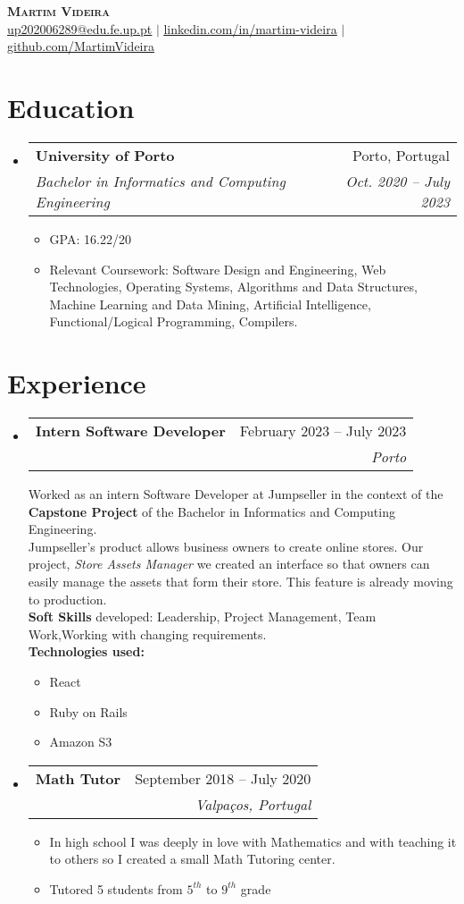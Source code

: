 \documentclass[letterpaper,11pt]{article}
\makeatletter
\newcommand{\resumeItem}[1]{
  \item\small{
    {#1 \vspace{-2pt}}
  }
}
\newcommand{\resumeSubheading}[4]{
  \vspace{-2pt}\item
    \begin{tabular*}{0.97\textwidth}[t]{l@{\extracolsep{\fill}}r}
      \textbf{#1} & #2 \\
      \textit{\small#3} & \textit{\small #4} \\
    \end{tabular*}\vspace{-7pt}
}
\newcommand{\resumeSubHeadingListStart}{\begin{itemize}[leftmargin=0.15in, label={}]}
\newcommand{\resumeSubHeadingListEnd}{\end{itemize}}
\newcommand{\resumeItemListStart}{\begin{itemize}}
\newcommand{\resumeItemListEnd}{\end{itemize}\vspace{-5pt}}
\makeatother
\begin{document}
\begin{center}
    \textbf{\Huge \scshape Martim Videira} \\ \vspace{1pt}
    \href{mailto:up202006289@edu.fe.up.pt}{\underline{up202006289@edu.fe.up.pt}} $|$ 
    \href{https://www.linkedin.com/in/martim-videira-aa766b24b/}{\underline{linkedin.com/in/martim-videira}} $|$
    \href{https://github.com/MartimVideira}{\underline{github.com/MartimVideira}}
\end{center}


\section{Education}
  \resumeSubHeadingListStart
    \resumeSubheading
      {University of Porto}{Porto, Portugal}
      {Bachelor in Informatics and Computing Engineering}{Oct. 2020 –  July 2023}
      \resumeItemListStart
        \resumeItem{GPA: 16.22/20 }
        \resumeItem{Relevant Coursework: Software Design and Engineering, Web Technologies, Operating Systems, Algorithms and Data Structures, Machine Learning and Data Mining, Artificial Intelligence, Functional/Logical Programming, Compilers.}
      \resumeItemListEnd
  \resumeSubHeadingListEnd

\section{Experience}
  \resumeSubHeadingListStart
    \resumeSubheading
      {Intern Software Developer }{February 2023 -- July 2023}
      {}{Porto}
      
    {Worked as an intern Software Developer at Jumpseller in the context of the \textbf{Capstone Project} of the Bachelor in Informatics and Computing Engineering.\\}
    Jumpseller's product allows business owners to create online stores. Our project, \emph{Store Assets Manager} we created an interface so that owners can easily manage the assets that form their store. This feature is already moving to production.
    {\\ \textbf{Soft Skills} developed: Leadership, Project Management, Team Work,Working with changing requirements.\\}
    {\textbf{Technologies used:}}
    \resumeItemListStart
        \resumeItem{React}
        \resumeItem{Ruby on Rails}
        \resumeItem{Amazon S3}
      \resumeItemListEnd
    \resumeSubheading
      {Math Tutor}{September 2018 -- July 2020}
      {}{Valpaços, Portugal}
      \resumeItemListStart
        \resumeItem{In high school I was deeply in love with Mathematics and with teaching it to others so I created a small Math Tutoring center.}\\
        \resumeItem{Tutored 5 students from $5^{th}$  to $9^{th}$ grade}
      \resumeItemListEnd
  \resumeSubHeadingListEnd
\end{document}
